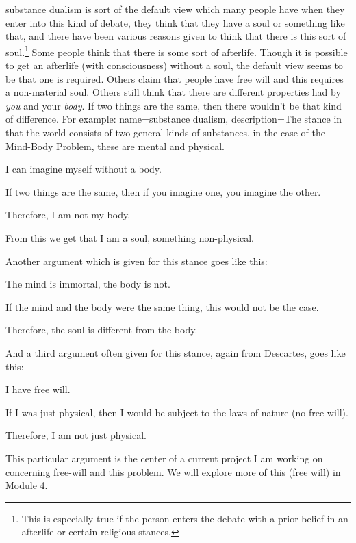\Gls{substance dualism} is sort of the default view which many people have when they enter into this kind of debate, they think that they have a soul or something like that, and there have been various reasons given to think that there is this sort of soul.\footnote{This is especially true if the person enters the debate with a prior belief in an afterlife or certain religious stances.} Some people think that there is some sort of afterlife. Though it is possible to get an afterlife (with consciousness) without a soul, the default view seems to be that one is required. Others claim that people have free will and this requires a non-material soul. Others still think that there are different properties had by \emph{you} and your \emph{body}. If two things are the same, then there wouldn't be that kind of difference. For example:
{
name=substance dualism,
description={The stance in that the world consists of two general kinds of substances, in the case of the Mind-Body Problem, these are mental and physical.}
}
\begin{earg}
    \item[1 ] I can imagine myself without a body.
    \item[2 ] If two things are the same, then if you imagine one, you imagine the other.
    \item[3 ] Therefore, I am not my body.
\end{earg}
From this we get that I am a soul, something non-physical.

Another argument which is given for this stance goes like this:
\begin{earg}
    \item[1 ] The mind is immortal, the body is not.
    \item[2 ] If the mind and the body were the same thing, this would not be the case.
    \item[3 ] Therefore, the soul is different from the body.
\end{earg}
And a third argument often given for this stance, again from Descartes, goes like this:
\begin{earg}
    \item[1 ] I have free will.
    \item[2 ] If I was just physical, then I would be subject to the laws of nature (no free will).
    \item[3 ] Therefore, I am not just physical.
\end{earg}
This particular argument is the center of a current project I am working on concerning free-will and this problem. We will explore more of this (free will) in Module 4.

